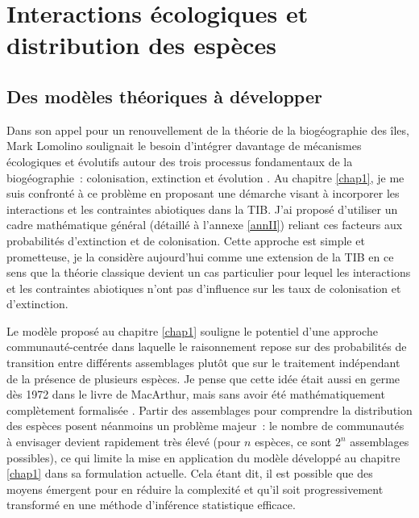 \section*{Interactions écologiques et distribution des
espèces}\label{interactions-uxe9cologiques-et-distribution-des-espuxe8ces}

\subsection*{Des modèles théoriques à
développer}\label{des-moduxe8les-thuxe9oriques-uxe0-duxe9velopper}

Dans son appel pour un renouvellement de la théorie de la biogéographie
des îles, Mark Lomolino soulignait le besoin d'intégrer davantage de
mécanismes écologiques et évolutifs autour des trois processus
fondamentaux de la biogéographie~: colonisation, extinction et évolution
\citep{Lomolino2000}. Au chapitre \ref{chap1}, je me suis confronté à ce
problème en proposant une démarche visant à incorporer les interactions
et les contraintes abiotiques dans la TIB. J'ai proposé d'utiliser un
cadre mathématique général (détaillé à l'annexe \ref{annII}) reliant ces
facteurs aux probabilités d'extinction et de colonisation. Cette
approche est simple et prometteuse, je la considère aujourd'hui comme
une extension de la TIB en ce sens que la théorie classique devient un
cas particulier pour lequel les interactions et les contraintes
abiotiques n'ont pas d'influence sur les taux de colonisation et
d'extinction.

Le modèle proposé au chapitre \ref{chap1} souligne le potentiel d'une
approche communauté-centrée dans laquelle le raisonnement repose sur des
probabilités de transition entre différents assemblages
\citep{Cazelles2016a} plutôt que sur le traitement indépendant de la
présence de plusieurs espèces. Je pense que cette idée était aussi en
germe dès 1972 dans le livre de MacArthur, mais sans avoir été
mathématiquement complètement formalisée
\citep{macarthur1972geographical}. Partir des assemblages pour
comprendre la distribution des espèces posent néanmoins un problème
majeur~: le nombre de communautés à envisager devient rapidement très
élevé (pour \(n\) espèces, ce sont \(2^n\) assemblages possibles), ce
qui limite la mise en application du modèle développé au chapitre
\ref{chap1} dans sa formulation actuelle. Cela étant dit, il est
possible que des moyens émergent pour en réduire la complexité et qu'il
soit progressivement transformé en une méthode d'inférence statistique
efficace.

